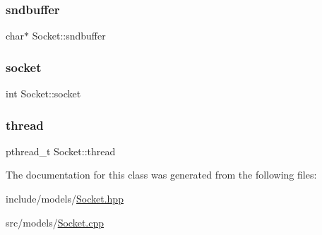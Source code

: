 \subsubsection{\texorpdfstring{sndbuffer}{sndbuffer}}
{\footnotesize\ttfamily char$\ast$ Socket\+::sndbuffer\hspace{0.3cm}{\ttfamily [private]}}

\mbox{\label{class_socket_ad514f7c19bf905d2618222aafd2ad65c}} 
\subsubsection{\texorpdfstring{socket}{socket}}
{\footnotesize\ttfamily int Socket\+::socket\hspace{0.3cm}{\ttfamily [private]}}

\mbox{\label{class_socket_a3f257ff5ebfc3431b8a33879a806bb06}} 
\subsubsection{\texorpdfstring{thread}{thread}}
{\footnotesize\ttfamily pthread\+\_\+t Socket\+::thread\hspace{0.3cm}{\ttfamily [private]}}



The documentation for this class was generated from the following files\+:\begin{DoxyCompactItemize}
\item 
include/models/\mbox{\hyperlink{_socket_8hpp}{Socket.\+hpp}}\item 
src/models/\mbox{\hyperlink{_socket_8cpp}{Socket.\+cpp}}\end{DoxyCompactItemize}
